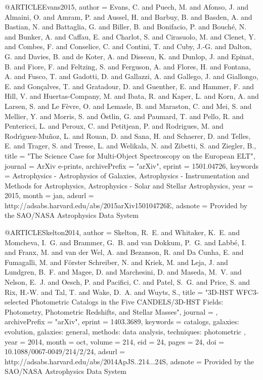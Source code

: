 \documentclass{aa}
\begin{document}
{{{{@ARTICLE{Evans2015,
   author = {{Evans}, C. and {Puech}, M. and {Afonso}, J. and {Almaini}, O. and 
	{Amram}, P. and {Aussel}, H. and {Barbuy}, B. and {Basden}, A. and 
	{Bastian}, N. and {Battaglia}, G. and {Biller}, B. and {Bonifacio}, P. and 
	{Bouch{\'e}}, N. and {Bunker}, A. and {Caffau}, E. and {Charlot}, S. and 
	{Cirasuolo}, M. and {Clenet}, Y. and {Combes}, F. and {Conselice}, C. and 
	{Contini}, T. and {Cuby}, J.-G. and {Dalton}, G. and {Davies}, B. and 
	{de Koter}, A. and {Disseau}, K. and {Dunlop}, J. and {Epinat}, B. and 
	{Fiore}, F. and {Feltzing}, S. and {Ferguson}, A. and {Flores}, H. and 
	{Fontana}, A. and {Fusco}, T. and {Gadotti}, D. and {Gallazzi}, A. and 
	{Gallego}, J. and {Giallongo}, E. and {Gon{\c c}alves}, T. and 
	{Gratadour}, D. and {Guenther}, E. and {Hammer}, F. and {Hill}, V. and 
	{Huertas-Company}, M. and {Ibata}, R. and {Kaper}, L. and {Korn}, A. and 
	{Larsen}, S. and {Le F{\`e}vre}, O. and {Lemasle}, B. and {Maraston}, C. and 
	{Mei}, S. and {Mellier}, Y. and {Morris}, S. and {{\"O}stlin}, G. and 
	{Paumard}, T. and {Pello}, R. and {Pentericci}, L. and {Peroux}, C. and 
	{Petitjean}, P. and {Rodrigues}, M. and {Rodr{\'{\i}}guez-Mu{\~n}oz}, L. and 
	{Rouan}, D. and {Sana}, H. and {Schaerer}, D. and {Telles}, E. and 
	{Trager}, S. and {Tresse}, L. and {Welikala}, N. and {Zibetti}, S. and 
	{Ziegler}, B.},
    title = "{The Science Case for Multi-Object Spectroscopy on the European ELT}",
  journal = {ArXiv e-prints},
archivePrefix = "arXiv",
   eprint = {1501.04726},
 keywords = {Astrophysics - Astrophysics of Galaxies, Astrophysics - Instrumentation and Methods for Astrophysics, Astrophysics - Solar and Stellar Astrophysics},
     year = 2015,
    month = jan,
   adsurl = {http://adsabs.harvard.edu/abs/2015arXiv150104726E},
  adsnote = {Provided by the SAO/NASA Astrophysics Data System}
}

@ARTICLE{Skelton2014,
   author = {{Skelton}, R.~E. and {Whitaker}, K.~E. and {Momcheva}, I.~G. and 
	{Brammer}, G.~B. and {van Dokkum}, P.~G. and {Labb{\'e}}, I. and 
	{Franx}, M. and {van der Wel}, A. and {Bezanson}, R. and {Da Cunha}, E. and 
	{Fumagalli}, M. and {F{\"o}rster Schreiber}, N. and {Kriek}, M. and 
	{Leja}, J. and {Lundgren}, B.~F. and {Magee}, D. and {Marchesini}, D. and 
	{Maseda}, M.~V. and {Nelson}, E.~J. and {Oesch}, P. and {Pacifici}, C. and 
	{Patel}, S.~G. and {Price}, S. and {Rix}, H.-W. and {Tal}, T. and 
	{Wake}, D.~A. and {Wuyts}, S.},
    title = "{3D-HST WFC3-selected Photometric Catalogs in the Five CANDELS/3D-HST Fields: Photometry, Photometric Redshifts, and Stellar Masses}",
  journal = {\apjs},
archivePrefix = "arXiv",
   eprint = {1403.3689},
 keywords = {catalogs, galaxies: evolution, galaxies: general, methods: data analysis, techniques: photometric },
     year = 2014,
    month = oct,
   volume = 214,
      eid = {24},
    pages = {24},
      doi = {10.1088/0067-0049/214/2/24},
   adsurl = {http://adsabs.harvard.edu/abs/2014ApJS..214...24S},
  adsnote = {Provided by the SAO/NASA Astrophysics Data System}
}

}}}}
\end{document}
